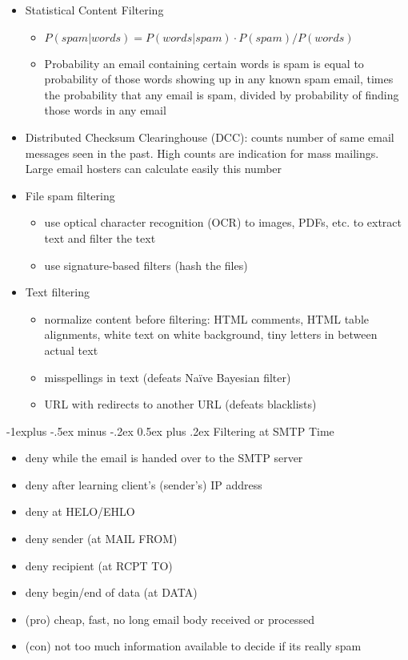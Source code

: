 \documentclass[a4paper,twocolumn]{article}
\makeatletter
\newenvironment{itemization}[1][\small]{%
    \begin{itemize}[leftmargin=*]
            #1
        }{%
    \end{itemize}
}
\renewcommand{\subsection}{%
    \@startsection{subsection}{2}{0mm}%
    {-1explus -.5ex minus -.2ex}%
    {0.5ex plus .2ex}%
    {\normalfont\small\bfseries}
}
\makeatother
\begin{document}
\begin{footnotesize}
\begin{itemization}
\item Statistical Content Filtering
\begin{itemization}
\item $P(spam | words) = P(words | spam) \cdot P(spam) / P(words)$
\item Probability an email containing certain words is spam is equal to probability of those words showing up in any known spam email, times the probability that any email is spam, divided by probability of finding those words in any email
\end{itemization}

\item Distributed Checksum Clearinghouse (DCC): counts number of same email messages seen in the past. High counts are indication for mass mailings. Large email hosters can calculate easily this number

\item File spam filtering
\begin{itemization}
\item use optical character recognition (OCR) to images, PDFs, etc. to extract text and filter the text
\item use signature-based filters (hash the files)
\end{itemization}

\item Text filtering
\begin{itemization}
\item normalize content before filtering: HTML comments, HTML table alignments, white text on white background, tiny letters in between actual text
\item misspellings in text (defeats Naïve Bayesian filter)
\item URL with redirects to another URL (defeats blacklists)
\end{itemization}
\end{itemization}

\subsection{Filtering at SMTP Time}
\begin{itemization}
\item deny while the email is handed over to the SMTP server
\item deny after learning client's (sender's) IP address
\item deny at HELO/EHLO
\item deny sender (at MAIL FROM)
\item deny recipient (at RCPT TO)
\item deny begin/end of data (at DATA)
\item (pro) cheap, fast, no long email body received or processed
\item (con) not too much information available to decide if its really spam
\end{itemization}


\end{footnotesize}
\end{document}
